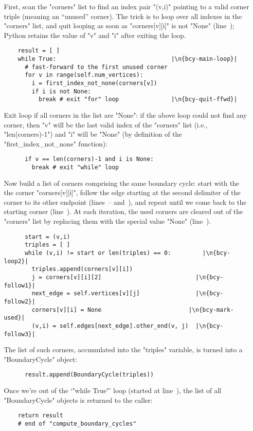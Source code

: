 First, scan the "corners" list to find an index pair "(v,i)" pointing
to a valid corner triple (meaning an ``unused'' corner). The trick is
to loop over all indexes in the "corners" list, and quit looping as
soon as "corners[v][i]" is not "None" (line~);
Python retains the value of "v" and "i" after exiting the loop.
\begin{lstlisting}
    result = [ ]
    while True:                                 |\n{bcy-main-loop}|
      # fast-forward to the first unused corner
      for v in range(self.num_vertices):
        i = first_index_not_none(corners[v])
        if i is not None:
          break # exit "for" loop               |\n{bcy-quit-ffwd}|

\end{lstlisting}
Exit loop if all corners in the list are "None": if the above loop
could not find any corner, then "v" will be the last valid index of
the "corners" list (i.e., "len(corners)-1") and "i" will be "None" (by
definition of the "first_index_not_none" function):
\begin{lstlisting}
      if v == len(corners)-1 and i is None:
        break # exit "while" loop

\end{lstlisting}
Now build a list of corners comprising the same boundary cycle: start
with the the corner "corners[v][i]", follow the edge starting at the
second delimiter of the corner to its other endpoint
(lines~-- and~), and
repeat until we come back to the starting corner
(line~). At each iteration, the used corners are cleared
out of the "corners" list by replacing them with the special value
"None" (line~).
\begin{lstlisting}
      start = (v,i)
      triples = [ ]
      while (v,i) != start or len(triples) == 0:         |\n{bcy-loop2}|
        triples.append(corners[v][i])
        j = corners[v][i][2]                           |\n{bcy-follow1}|
        next_edge = self.vertices[v][j]                |\n{bcy-follow2}|
        corners[v][i] = None                         |\n{bcy-mark-used}|
        (v,i) = self.edges[next_edge].other_end(v, j)  |\n{bcy-follow3}|
\end{lstlisting}
The list of such corners, accumulated into the "triples" variable, is
turned into a "BoundaryCycle" object:
\begin{lstlisting}
      result.append(BoundaryCycle(triples))

\end{lstlisting}
Once we're out of the `"while True"' loop (started at
line~), the list of all "BoundaryCycle" objects
is returned to the caller:
\begin{lstlisting}
    return result
    # end of "compute_boundary_cycles"
    
\end{lstlisting}


